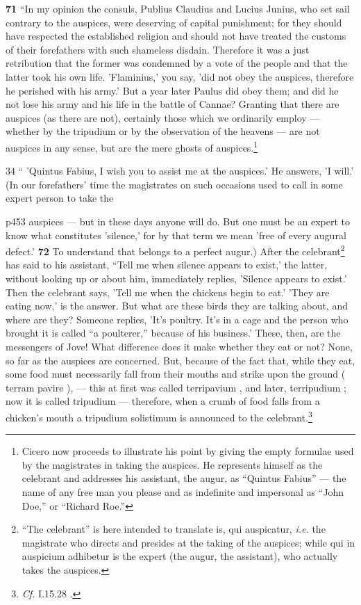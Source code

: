 \textbf{71} ``In my opinion the consuls, Publius Claudius and Lucius Junius, who set sail contrary to the auspices, were deserving of capital punishment; for they should have respected the established religion and should not have treated the customs of their forefathers with such shameless disdain. Therefore it was a just retribution that the former was condemned by a vote of the people and that the latter took his own life. 'Flaminius,' you say, 'did not obey the auspices, therefore he perished with his army.' But a year later Paulus did obey them; and did he not lose his army and his life in the battle of Cannae? Granting that there are auspices (as there are not), certainly those which we ordinarily employ \texthebrew{—} whether by the tripudium or by the observation of the heavens \texthebrew{—} are not auspices in any sense, but are the mere ghosts of auspices.\footnote{Cicero now proceeds to illustrate his point by giving the empty formulae used by the magistrates in taking the auspices. He represents himself as the celebrant and addresses his assistant, the augur, as ``Quintus Fabius'' \texthebrew{—} the name of any free man you please and as indefinite and impersonal as ``John Doe,'' or ``Richard Roe.''

}

34
`` 'Quintus Fabius, I wish you to assist me at the auspices.' He answers, 'I will.' (In our forefathers' time the magistrates on such occasions used to call in some expert person to take the

p453 auspices \texthebrew{—} but in these days anyone will do. But one must be an expert to know what constitutes 'silence,' for by that term we mean 'free of every augural defect.' \textbf{72} To understand that belongs to a perfect augur.) After the celebrant\texthebrew{}\footnote{``The celebrant'' is here intended to translate is, qui auspicatur, \emph{i.e.} the magistrate who directs and presides at the taking of the auspices; while qui in auspicium adhibetur is the expert (the augur, the assistant), who actually takes the auspices.

} has said to his assistant, ``Tell me when silence appears to exist,' the latter, without looking up or about him, immediately replies, 'Silence appears to exist.' Then the celebrant says, 'Tell me when the chickens begin to eat.' 'They are eating now,' is the answer. But what are these birds they are talking about, and where are they? Someone replies, 'It's poultry. It's in a cage and the person who brought it is called ``a poulterer,'' because of his business.' These, then, are the messengers of Jove! What difference does it make whether they eat or not? None, so far as the auspices are concerned. But, because of the fact that, while they eat, some food must necessarily fall from their mouths and strike upon the ground ( terram pavire ), \texthebrew{—} this at first was called terripavium , and later, terripudium ; now it is called tripudium \texthebrew{—} therefore, when a crumb of food falls from a chicken's mouth a tripudium solistimum is announced to the celebrant.\footnote{\emph{Cf.}
I.15.28 .

}

